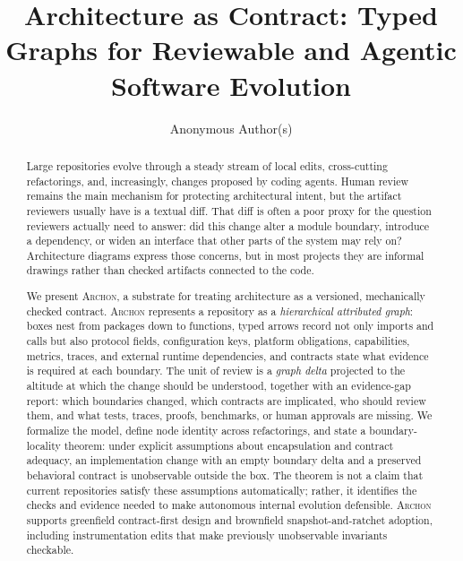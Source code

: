 \documentclass[sigconf,review,anonymous]{acmart}
\theoremstyle{plain}
\theoremstyle{definition}
\begin{document}
\title{Architecture as Contract: Typed Graphs
for Reviewable and Agentic Software Evolution}

\author{Anonymous Author(s)}

\renewcommand{\shortauthors}{Anon.}

\begin{abstract}
Large repositories evolve through a steady stream of local edits, cross-cutting
refactorings, and, increasingly, changes proposed by coding agents. Human
review remains the main mechanism for protecting architectural intent, but the
artifact reviewers usually have is a textual diff. That diff is often a poor
proxy for the question reviewers actually need to answer: did this change alter
a module boundary, introduce a dependency, or widen an interface that other
parts of the system may rely on? Architecture diagrams express those concerns,
but in most projects they are informal drawings rather than checked artifacts
connected to the code.

We present \textsc{Archon}, a substrate for treating architecture as a
versioned, mechanically checked contract. \textsc{Archon} represents a
repository as a \emph{hierarchical attributed graph}: boxes nest from packages
down to functions, typed arrows record not only imports and calls but also
protocol fields, configuration keys, platform obligations, capabilities,
metrics, traces, and external runtime dependencies, and contracts state what
evidence is required at each boundary. The unit of review is a \emph{graph
delta} projected to the altitude at which the change should be understood,
together with an evidence-gap report: which boundaries changed, which contracts
are implicated, who should review them, and what tests, traces, proofs,
benchmarks, or human approvals are missing. We formalize the model, define node
identity across refactorings, and state a boundary-locality theorem: under
explicit assumptions about encapsulation and contract adequacy, an
implementation change with an empty boundary delta and a preserved behavioral
contract is unobservable outside the box. The theorem is not a claim that
current repositories satisfy these assumptions automatically; rather, it
identifies the checks and evidence needed to make autonomous internal evolution
defensible. \textsc{Archon} supports greenfield contract-first design and
brownfield snapshot-and-ratchet adoption, including instrumentation edits that
make previously unobservable invariants checkable.
\end{abstract}
\end{document}
